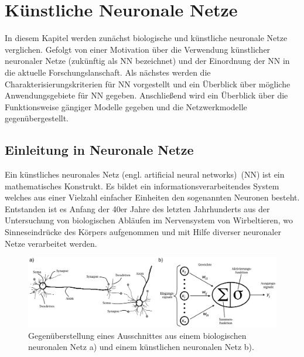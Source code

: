 

\section{Künstliche Neuronale Netze}

In diesem Kapitel werden zunächst biologische und künstliche neuronale Netze verglichen. Gefolgt von einer Motivation über die Verwendung künstlicher neuronaler Netze (zukünftig als NN bezeichnet) und der Einordnung der NN in die aktuelle Forschungslanschaft. Als nächstes werden die Charakterisierungskriterien für NN vorgestellt und ein Überblick über mögliche Anwendungsgebiete für NN gegeben. Anschließend wird ein Überblick über die Funktionsweise gängiger Modelle gegeben und die Netzwerkmodelle gegenübergestellt.

\subsection{Einleitung in Neuronale Netze}




Ein künstliches neuronales Netz (engl. artificial neural networks)~(NN) ist ein mathematisches Konstrukt. Es bildet ein informationsverarbeitendes System welches aus einer Vielzahl einfacher Einheiten den sogenannten Neuronen besteht. Entstanden ist es Anfang der 40er Jahre des letzten Jahrhunderts aus der Untersuchung von biologischen Abläufen im Nervensystem von Wirbeltieren, wo Sinneseindrücke des Körpers aufgenommen und mit Hilfe diverser neuronaler Netze verarbeitet werden.

\begin{figure}[!htb]
    \centering
        \includegraphics[width=1\textwidth]{Bilder/BNN_ANN.png}
    \caption{Gegenüberstellung eines Ausschnittes aus einem biologischen neuronalen Netz a)\protect\footnotemark{} und einem künstlichen neuronalen Netz b).}
    \label{fig:BNN_ANN}
\end{figure}

